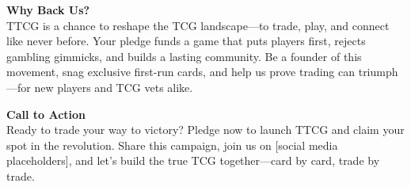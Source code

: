 \textbf{Why Back Us?} \\
TTCG is a chance to reshape the TCG landscape—to trade, play, and connect like never before. Your pledge funds a game that puts players first, rejects gambling gimmicks, and builds a lasting community. Be a founder of this movement, snag exclusive first-run cards, and help us prove trading can triumph—for new players and TCG vets alike.

\textbf{Call to Action} \\
Ready to trade your way to victory? Pledge now to launch TTCG and claim your spot in the revolution. Share this campaign, join us on [social media placeholders], and let’s build the true TCG together—card by card, trade by trade.
